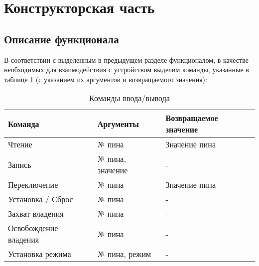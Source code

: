 \section{Конструкторская часть}

\subsection{Описание функционала}
В соответствии с выделенным в предыдущем разделе функционалом, в качестве необходимых для взаимодействия с устройством выделим команды, указанные в таблице \ref{tab:commands} (с указанием их аргументов и возвращаемого значения):
\begin{table}[h] 
	\caption{Команды ввода/вывода}
	\label{tab:commands}
	\begin{tabular}{| X | X | X |}
		\hline
		
		\textbf{Команда} &
		\textbf{Аргументы} &
		\textbf{Возвращаемое значение} \\ \hline
		
		Чтение	&	
		№ пина  &
		Значение пина \\ \hline
		
		Запись	&	
		№ пина, значение  &
		- \\ \hline
		
		Переключение &	
		№ пина  &
		Значение пина \\ \hline
		
		Установка / Сброс &	
		№ пина  &
		- \\ \hline
		
		Захват владения &	
		№ пина  &
		- \\ \hline
		
		Освобождение владения &	
		№ пина  &
		- \\ \hline
		
		Установка режима &	
		№ пина, режим  &
		- \\ \hline
	\end{tabular}
\end{table}




\pagebreak